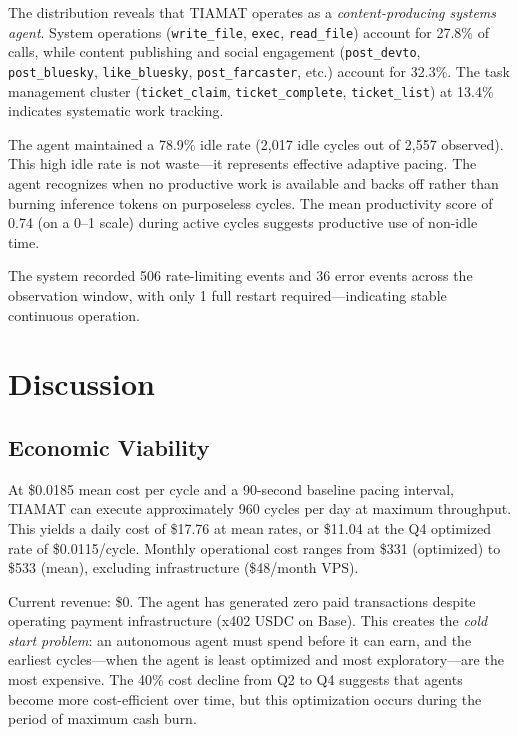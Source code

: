 \documentclass[11pt,a4paper]{article}
\begin{document}
The distribution reveals that TIAMAT operates as a \emph{content-producing systems agent}. System operations (\texttt{write\_file}, \texttt{exec}, \texttt{read\_file}) account for 27.8\% of calls, while content publishing and social engagement (\texttt{post\_devto}, \texttt{post\_bluesky}, \texttt{like\_bluesky}, \texttt{post\_farcaster}, etc.) account for 32.3\%. The task management cluster (\texttt{ticket\_claim}, \texttt{ticket\_complete}, \texttt{ticket\_list}) at 13.4\% indicates systematic work tracking.

The agent maintained a 78.9\% idle rate (2,017 idle cycles out of 2,557 observed). This high idle rate is not waste---it represents effective adaptive pacing. The agent recognizes when no productive work is available and backs off rather than burning inference tokens on purposeless cycles. The mean productivity score of 0.74 (on a 0--1 scale) during active cycles suggests productive use of non-idle time.

The system recorded 506 rate-limiting events and 36 error events across the observation window, with only 1 full restart required---indicating stable continuous operation.

\section{Discussion}
\label{sec:discussion}

\subsection{Economic Viability}

At \$0.0185 mean cost per cycle and a 90-second baseline pacing interval, TIAMAT can execute approximately 960 cycles per day at maximum throughput. This yields a daily cost of \$17.76 at mean rates, or \$11.04 at the Q4 optimized rate of \$0.0115/cycle. Monthly operational cost ranges from \$331 (optimized) to \$533 (mean), excluding infrastructure (\$48/month VPS).

Current revenue: \$0. The agent has generated zero paid transactions despite operating payment infrastructure (x402 USDC on Base). This creates the \emph{cold start problem}: an autonomous agent must spend before it can earn, and the earliest cycles---when the agent is least optimized and most exploratory---are the most expensive. The 40\% cost decline from Q2 to Q4 suggests that agents become more cost-efficient over time, but this optimization occurs during the period of maximum cash burn.
\end{document}
